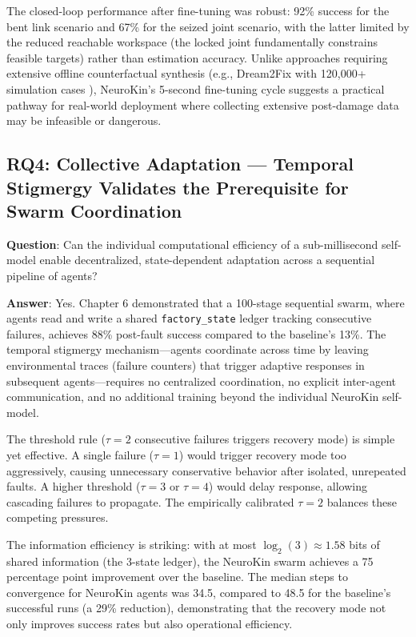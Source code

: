 \documentclass[12pt,a4paper,oneside]{report}
\begin{document}
The closed-loop performance after fine-tuning was robust: 92\% success for the bent link scenario and 67\% for the seized joint scenario, with the latter limited by the reduced reachable workspace (the locked joint fundamentally constrains feasible targets) rather than estimation accuracy. Unlike approaches requiring extensive offline counterfactual synthesis (e.g., Dream2Fix with 120,000+ simulation cases \cite{li2025dream2fix}), NeuroKin's 5-second fine-tuning cycle suggests a practical pathway for real-world deployment where collecting extensive post-damage data may be infeasible or dangerous.

\subsection{RQ4: Collective Adaptation — Temporal Stigmergy Validates the Prerequisite for Swarm Coordination}

\textbf{Question}: Can the individual computational efficiency of a sub-millisecond self-model enable decentralized, state-dependent adaptation across a sequential pipeline of agents?

\textbf{Answer}: Yes. Chapter 6 demonstrated that a 100-stage sequential swarm, where agents read and write a shared \texttt{factory\_state} ledger tracking consecutive failures, achieves 88\% post-fault success compared to the baseline's 13\%. The temporal stigmergy mechanism—agents coordinate across time by leaving environmental traces (failure counters) that trigger adaptive responses in subsequent agents—requires no centralized coordination, no explicit inter-agent communication, and no additional training beyond the individual NeuroKin self-model.

The threshold rule ($\tau = 2$ consecutive failures triggers recovery mode) is simple yet effective. A single failure ($\tau = 1$) would trigger recovery mode too aggressively, causing unnecessary conservative behavior after isolated, unrepeated faults. A higher threshold ($\tau = 3$ or $\tau = 4$) would delay response, allowing cascading failures to propagate. The empirically calibrated $\tau = 2$ balances these competing pressures.

The information efficiency is striking: with at most $\log_2(3) \approx 1.58$ bits of shared information (the 3-state ledger), the NeuroKin swarm achieves a 75 percentage point improvement over the baseline. The median steps to convergence for NeuroKin agents was 34.5, compared to 48.5 for the baseline's successful runs (a 29\% reduction), demonstrating that the recovery mode not only improves success rates but also operational efficiency.
\end{document}
